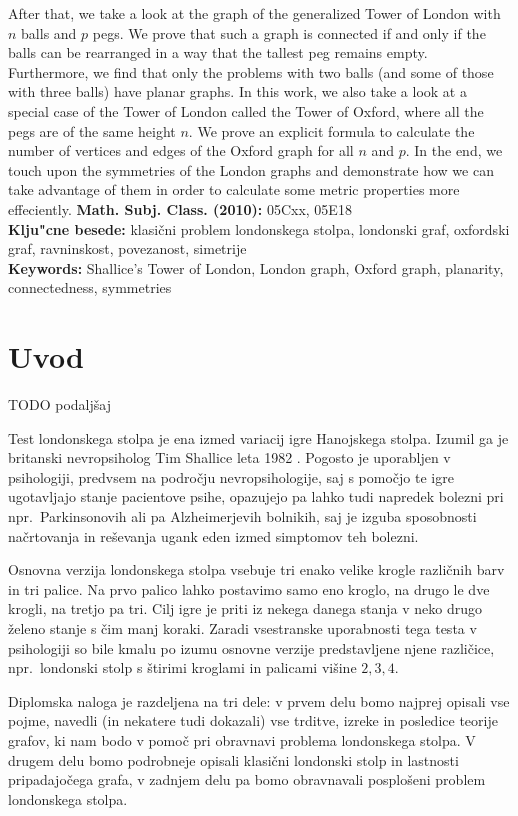 \documentclass[12pt,a4paper]{amsart}
\theoremstyle{definition} %
\theoremstyle{plain} %
\begin{document}
After that, we take a look at the graph of the generalized Tower of London with $n$ balls and $p$ pegs. We prove that such a graph is connected if and only if the balls can be rearranged in a way that the tallest peg remains empty. Furthermore, we find that only  the problems with two balls (and some of those with three balls) have planar graphs. In this work, we also take a look at a special case of the Tower of London called the Tower of Oxford, where all the pegs are of the same height $n$. We prove an explicit formula to calculate the number of vertices and edges of the Oxford graph for all $n$ and $p$. In the end, we touch upon the symmetries of the London graphs and demonstrate how we can take advantage of them in order to calculate some metric properties more effeciently.
\vfill\noindent
{\bf Math. Subj. Class. (2010):} 05Cxx, 05E18 \\[1mm]  
{\bf Klju"cne besede:} klasični problem londonskega stolpa, londonski graf, oxfordski graf, ravninskost, povezanost, simetrije \\[1mm]  
{\bf Keywords:} Shallice's Tower of London, London graph, Oxford graph, planarity, connectedness, symmetries
\pagebreak


 
\section{Uvod}
TODO podaljšaj

Test londonskega stolpa je ena izmed variacij igre Hanojskega stolpa. Izumil ga je britanski nevropsiholog Tim Shallice leta 1982 \cite{bib:wikishal}. Pogosto je uporabljen v psihologiji, predvsem na področju nevropsihologije, saj s pomočjo te igre ugotavljajo stanje pacientove psihe, opazujejo pa lahko tudi napredek bolezni pri npr.\ Parkinsonovih ali pa Alzheimerjevih bolnikih, saj je izguba sposobnosti načrtovanja in reševanja ugank eden izmed simptomov teh bolezni.

Osnovna verzija londonskega stolpa vsebuje tri enako velike krogle različnih barv in tri palice. Na prvo palico lahko postavimo samo eno kroglo, na drugo le dve krogli, na tretjo pa tri. Cilj igre je priti iz nekega danega stanja v neko drugo želeno stanje s čim manj koraki. 
Zaradi vsestranske uporabnosti tega testa v psihologiji so bile kmalu po izumu osnovne verzije predstavljene njene različice, npr.~londonski stolp s štirimi kroglami in palicami višine $2,3,4$.

Diplomska naloga je razdeljena na tri dele: v prvem delu bomo najprej opisali vse pojme, navedli (in nekatere tudi dokazali) vse trditve, izreke in posledice teorije grafov, ki nam bodo v pomoč pri obravnavi problema londonskega stolpa. V drugem delu bomo podrobneje opisali klasični londonski stolp in lastnosti pripadajočega grafa, v zadnjem delu pa bomo obravnavali posplošeni problem londonskega stolpa.
\end{document}
